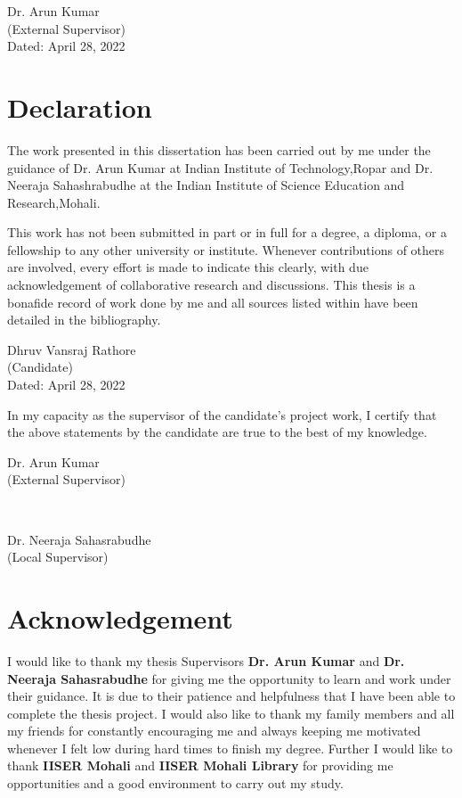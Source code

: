 \documentclass[12pt]{report}
\begin{document}
\begin{flushright}
    Dr. Arun Kumar
    \\
    (External Supervisor)
    \\
    \vspace{4cm}
    Dated: April 28, 2022
\end{flushright}
\newpage

\section*{Declaration}
The work presented in this dissertation has been carried out by me under the guidance of Dr. Arun Kumar at Indian Institute of Technology,Ropar and Dr. Neeraja Sahashrabudhe at the Indian Institute of Science Education and Research,Mohali.\par
This work has not been submitted in part or in full for a degree, a diploma, or a fellowship to any other university or institute. Whenever contributions of others are involved, every effort is made to indicate this clearly, with due acknowledgement of collaborative research and discussions. This thesis is a bonafide record of work done by me and all sources listed within have been detailed in the bibliography.
\vskip 3cm
\begin{flushright}
 Dhruv Vansraj Rathore \\
	(Candidate)\\
	\vskip 20pt
	Dated: April 28, 2022
\end{flushright}
In my capacity as the supervisor of the candidate's project work, I certify that the above statements by the candidate are true to the best of my knowledge.
\vskip 3cm
\noindent
~
\begin{minipage}[t]{0.5\textwidth}
\begin{flushleft}
Dr. Arun Kumar\\
(External Supervisor)
\end{flushleft}
\end{minipage}
~
\begin{minipage}[t]{0.5\textwidth}
\begin{flushright}
Dr. Neeraja Sahasrabudhe\\
(Local Supervisor)
\end{flushright}
\end{minipage}
\newpage

\section*{Acknowledgement}
I would like to thank my thesis Supervisors \textbf{Dr. Arun Kumar} and \textbf{Dr. Neeraja Sahasrabudhe} for giving me the opportunity to learn and work under their guidance. It is due to their patience and helpfulness that I have been able to complete the thesis project. I would also like to thank my family members and all my friends for constantly encouraging me and always keeping me motivated whenever I felt low during hard times to finish my degree. Further I would like to thank \textbf{IISER Mohali} and \textbf{IISER Mohali Library} for providing me opportunities and  a good environment to carry out my study. 
\end{document}
